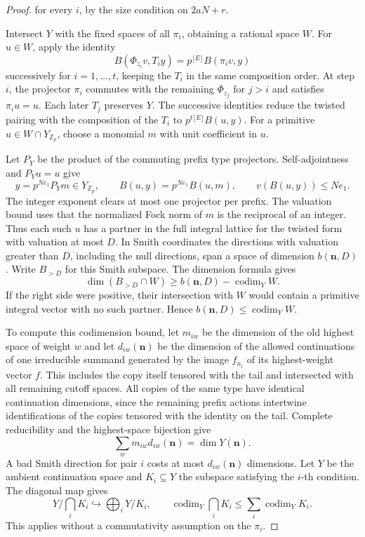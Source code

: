\begin{proof}
for every \(i\), by the size condition on \(2aN+r\).

Intersect \(Y\) with the fixed spaces of all \(\pi_i\), obtaining
a rational space \(W\). For \(u\in W\), apply the identity
\[
 B(\Phi_{z_i}v,T_i y)=p^{\lfloor E\rfloor}B(\pi_i v,y)
\]
successively for \(i=1,\ldots,t\), keeping the \(T_i\) in the same
composition order. At step \(i\), the projector \(\pi_i\) commutes with
the remaining \(\Phi_{z_j}\) for \(j>i\) and satisfies \(\pi_i u=u\).
Each later \(T_j\) preserves \(Y\).
The successive identities reduce the twisted pairing with the
composition of the \(T_i\) to \(p^{t\lfloor E\rfloor}B(u,y)\).
For a primitive \(u\in W\cap Y_{\mathbb Z_p}\), choose a monomial
\(m\) with unit coefficient in \(u\).

Let \(P_Y\) be the product of
the commuting prefix type projectors. Self-adjointness and
\(P_Yu=u\) give
\[
 y=p^{Ne_1}P_Ym\in Y_{\mathbb Z_p},\qquad
 B(u,y)=p^{Ne_1}B(u,m),\qquad v(B(u,y))\le Ne_1.
\]
The integer exponent clears at most one projector per prefix.
The valuation bound uses that the normalized Fock norm of \(m\)
is the reciprocal of an integer.
Thus each such \(u\) has a partner in the full integral lattice
for the twisted form with valuation at most \(D\).
In Smith coordinates the directions with valuation greater
than \(D\), including the null directions, span a space of
dimension \(b(\mathbf n,D)\). Write \(B_{>D}\) for this Smith subspace. The dimension formula gives
\[
 \dim(B_{>D}\cap W)\ge b(\mathbf n,D)-\operatorname{codim}_Y W.
\]
If the right side were positive, their intersection with \(W\) would contain a primitive
integral vector with no such partner. Hence
\(b(\mathbf n,D)\le\operatorname{codim}_Y W\).

To compute this codimension bound, let \(m_{iw}\) be the
dimension of the old highest space of weight \(w\) and let
\(d_{iw}(\mathbf n)\) be the dimension of the allowed continuations
of one irreducible summand generated by the image
\(f_{n_i}\) of its highest-weight vector \(f\). This
includes the copy itself tensored with the tail and intersected
with all remaining cutoff spaces. All copies of the same type
have identical continuation dimensions, since the remaining
prefix actions intertwine identifications of the copies tensored
with the identity on the tail. Complete reducibility and the
highest-space bijection give
\[
     \sum_w m_{iw}d_{iw}(\mathbf n)=\dim Y(\mathbf n).
\]
A bad Smith direction for pair \(i\) costs at most
\(d_{iw}(\mathbf n)\) dimensions. Let \(Y\) be the ambient continuation space and \(K_i\subseteq Y\)
the subspace satisfying the \(i\)-th condition. The diagonal map gives
\[
 Y/\bigcap_i K_i\hookrightarrow\bigoplus_i Y/K_i,\qquad
 \operatorname{codim}_Y\bigcap_iK_i\le\sum_i\operatorname{codim}_Y K_i .
\]
This applies without a commutativity assumption on the \(\pi_i\).


\end{proof}
